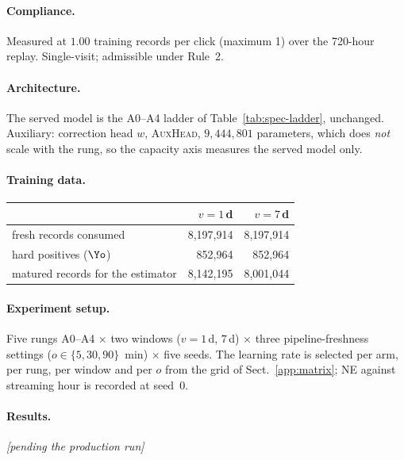 \paragraph{Compliance.} Measured at $1.00$ training records per click (maximum 1) over the 720-hour replay. Single-visit; admissible under Rule~2.

\paragraph{Architecture.} The served model is the A0--A4 ladder of Table~\ref{tab:spec-ladder}, unchanged. Auxiliary: correction head $w$, \textsc{AuxHead}, $9{,}444{,}801$ parameters, which does \emph{not} scale with the rung, so the capacity axis measures the served model only.

\paragraph{Training data.}
\begin{center}\small\begin{tabular}{lrr}
\toprule
 & $v=1$\,d & $v=7$\,d\\
\midrule
fresh records consumed & 8{,}197{,}914 & 8{,}197{,}914\\
hard positives ($\Yo$) & 852{,}964 & 852{,}964\\
matured records for the estimator & 8{,}142{,}195 & 8{,}001{,}044\\
\bottomrule
\end{tabular}\end{center}

\paragraph{Experiment setup.} Five rungs A0--A4 $\times$ two windows ($v=1$\,d, $7$\,d) $\times$ three pipeline-freshness settings ($o \in \{5, 30, 90\}$~min) $\times$ five seeds. The learning rate is selected per arm, per rung, per window and per $o$ from the grid of Sect.~\ref{app:matrix}; NE against streaming hour is recorded at seed~0.

\paragraph{Results.} \emph{[pending the production run]}

